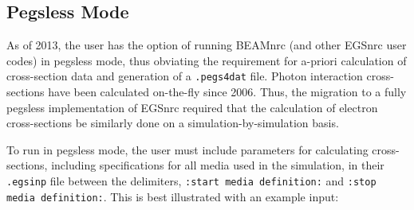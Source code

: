 \documentclass[12pt,twoside]{article}
\begin{document}
\subsection{Pegsless Mode}
As of 2013, the user has the option of running BEAMnrc (and other EGSnrc user codes) in pegsless
mode, thus obviating the requirement for a-priori calculation of cross-section data and generation
of a {\tt .pegs4dat} file.  Photon interaction cross-sections have been calculated on-the-fly since
2006.  Thus, the migration to a fully pegsless implementation of EGSnrc required that
the calculation of electron cross-sections be similarly done on a simulation-by-simulation
basis.

To run in pegsless mode, the user must include parameters for calculating cross-sections, including
specifications for all media used in the simulation, in their {\tt .egsinp} file between the
delimiters, {\tt :start media definition:} and {\tt :stop media definition:}.  This is best illustrated
with an example input:
\end{document}
